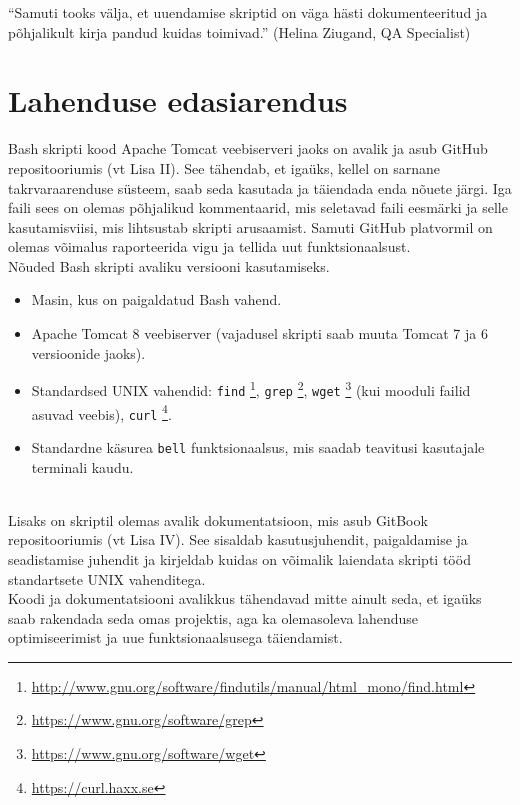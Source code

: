\documentclass[12pt]{report}
\newcommand{\code}[1]{\texttt{#1}}
\begin{document}
    \begin{displayquote}
    ``Samuti tooks välja, et uuendamise skriptid on väga hästi dokumenteeritud ja põhjalikult kirja pandud kuidas toimivad.'' (Helina Ziugand, QA Specialist)
    \end{displayquote}

  \newpage
  
  \section{Lahenduse edasiarendus}
  
  Bash skripti kood Apache Tomcat veebiserveri jaoks on avalik ja asub GitHub repositooriumis (vt Lisa II). See tähendab, et igaüks, kellel on sarnane takrvaraarenduse süsteem, saab seda kasutada ja täiendada enda nõuete järgi. Iga faili sees on olemas põhjalikud kommentaarid, mis seletavad faili eesmärki ja selle kasutamisviisi, mis lihtsustab skripti arusaamist. Samuti GitHub platvormil on olemas võimalus raporteerida vigu ja tellida uut funktsionaalsust.\\
  
  Nõuded Bash skripti avaliku versiooni kasutamiseks.
  \begin{itemize}
    \item Masin, kus on paigaldatud Bash vahend.
    \item Apache Tomcat 8 veebiserver (vajadusel skripti saab muuta Tomcat 7 ja 6 versioonide jaoks).
    \item Standardsed UNIX vahendid: \code{find} \footnote{\url{http://www.gnu.org/software/findutils/manual/html_mono/find.html}}, \code{grep} \footnote{\url{https://www.gnu.org/software/grep}}, \code{wget} \footnote{\url{https://www.gnu.org/software/wget}} (kui mooduli failid asuvad veebis), \code{curl} \footnote{\url{https://curl.haxx.se}}.
    \item Standardne käsurea \code{bell} funktsionaalsus, mis saadab teavitusi kasutajale terminali kaudu.
  \end{itemize}\\
  
  Lisaks on skriptil  olemas avalik dokumentatsioon, mis asub GitBook repositooriumis (vt Lisa IV). See sisaldab kasutusjuhendit, paigaldamise ja seadistamise juhendit ja kirjeldab kuidas on võimalik laiendata skripti tööd standartsete UNIX vahenditega.\\
  
  Koodi ja dokumentatsiooni avalikkus tähendavad mitte ainult seda, et igaüks saab rakendada seda omas projektis, aga ka olemasoleva lahenduse optimiseerimist ja uue funktsionaalsusega täiendamist.
  
\end{document}
